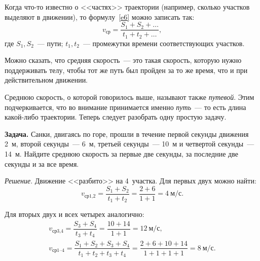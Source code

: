 \documentclass[main.tex]{subfiles}
\begin{document}
Когда что-то известно о <<частях>> траектории (например, сколько участков выделяют в движении), то формулу~\eqref{e6} можно записать так:
\begin{equation*}
    v_\text{ср}=\dfrac{S_\text{1}+S_\text{2}+\ldots}{t_\text{1}+t_\text{2}+\ldots},
\end{equation*}
где $S_\text{1},S_\text{2}$~--- пути; $t_\text{1},t_\text{2}$~--- промежутки времени соответствующих участков.

Можно сказать, что средняя скорость~--- это такая скорость, которую нужно поддерживать телу, чтобы тот же путь был пройден за то же время, что и при действительном движении. 

Среднюю скорость, о которой говорилось выше, называют также \emph{путевой}. Этим подчеркивается, что во внимание принимается именно \emph{путь}~--- то есть длина какой-либо траектории. Теперь следует разобрать одну простую задачу.

\medskip

\noindent\textbf{Задача.} Санки, двигаясь по горе, прошли в течение первой секунды движения 2~м, второй секунды~--- 6~м, третьей секунды~--- 10~м и четвертой секунды~--- 14~м. Найдите среднюю скорость за первые две секунды, за последние две секунды и за все время.

\smallskip

\noindent\emph{Решение}. Движение <<разбито>> на 4~участка. Для первых двух можно найти:
\begin{equation*}
    v_\text{ср1,2}=\dfrac{S_\text{1}+S_\text{2}}{t_\text{1}+t_\text{2}}=\dfrac{2+6}{1+1}=4\ \text{м$/$с}.
\end{equation*}

Для вторых двух и всех четырех аналогично:
\begin{gather*}
    v_\text{ср3,4}=\dfrac{S_\text{3}+S_\text{4}}{t_\text{3}+t_\text{4}}=\dfrac{10+14}{1+1}=12\ \text{м$/$с},\\
    v_\text{ср1--4}=\dfrac{S_\text{1}+S_\text{2}+S_\text{3}+S_\text{4}}{t_\text{1}+t_\text{2}+t_\text{3}+t_\text{4}}=\dfrac{2+6+10+14}{1+1+1+1}=8\ \text{м$/$с}.
\end{gather*}

 
\end{document}
